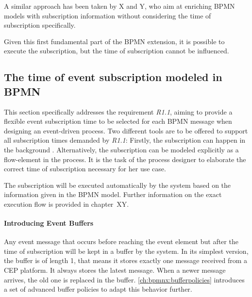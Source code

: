 A similar approach has been taken by X and Y, who aim at enriching BPMN models with subscription information without considering the time of subscription specifically.

Given this first fundamental part of the BPMN extension, it is possible to execute the subscription, but the time of subscription cannot be influenced.

\subsection{The time of event subscription modeled in BPMN}\label{ch:bpmnx:subscriptiontimes}

This section specifically addresses the requirement \textit{R1.1}, aiming to provide a flexible event subscription time to be selected for each BPMN message when designing an event-driven process.
Two different tools are to be offered to support all subscription times demanded by \textit{R1.1}: Firstly, the subscription can happen in the background . Alternatively, the subscription can be modeled explicitly as a flow-element in the process.
It is the task of the process designer to elaborate the correct time of subscription necessary for her use case.

The subscription will be executed automatically by the system based on the information given in the BPMN model. Further information on the exact execution flow is provided in chapter~XY.

\paragraph{Introducing Event Buffers}
Any event message that occurs before reaching the event element but after the time of subscription will be kept in a buffer by the system.
In its simplest version, the buffer is of length 1, that means it stores exactly one message received from a CEP platform. It always stores the latest message. When a newer message arrives, the old one is replaced in the buffer.
\autoref{ch:bpmnx:bufferpolicies} introduces a set of advanced buffer policies to adapt this behavior further.


